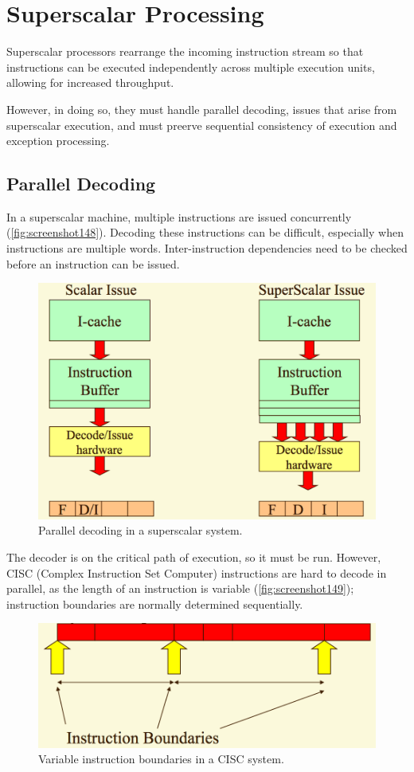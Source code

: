 \chapter{Superscalar Processing}
Superscalar processors rearrange the incoming instruction stream so that instructions can be executed independently across multiple execution units, allowing for increased throughput.

However, in doing so, they must handle parallel decoding, issues that arise from superscalar execution, and must preerve sequential consistency of execution and exception processing.

\section{Parallel Decoding}
In a superscalar machine, multiple instructions are issued concurrently (\autoref{fig:screenshot148}). Decoding these instructions can be difficult, especially when instructions are multiple words. Inter-instruction dependencies need to be checked before an instruction can be issued.

\begin{figure}
\centering
\includegraphics[width=0.7\linewidth]{screenshot148}
\caption{Parallel decoding in a superscalar system.}
\label{fig:screenshot148}
\end{figure}

The decoder is on the critical path of execution, so it must be run. However, CISC (Complex Instruction Set Computer) instructions are hard to decode in parallel, as the length of an instruction is variable (\autoref{fig:screenshot149}); instruction boundaries are normally determined sequentially.

\begin{figure}
\centering
\includegraphics[width=0.7\linewidth]{screenshot149}
\caption{Variable instruction boundaries in a CISC system.}
\label{fig:screenshot149}
\end{figure}

